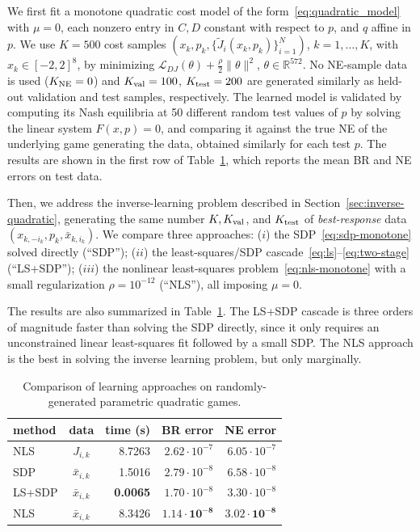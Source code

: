 \documentclass[11pt, a4paper]{article}
\renewcommand{\arraystretch}{1.3}
\newcommand{\rr}{\mathbb{R}}
\newcommand{\LL}{\mathcal{L}}
\theoremstyle{remark}
\theoremstyle{plain}
\begin{document}
We first fit a monotone quadratic cost model of the form~\eqref{eq:quadratic_model} with $\mu=0$, each nonzero entry in $C,D$ constant with respect to $p$, and $q$ affine in $p$. We use $K=500$ cost samples $(x_k,p_k,\{\tilde J_i(x_k,p_k)\}_{i=1}^N)$, $k=1,\ldots,K$, with $x_k\in[-2,2]^8$, by minimizing $\LL_{DJ}(\theta)+\frac{\rho}{2}\|\theta\|^2$, $\theta\in\rr^{572}$. 
No NE-sample data is used ($K_{\rm NE}=0$) and
$K_{\rm val}=100$, $K_{\rm test}=200$ are generated similarly as held-out validation and test samples, respectively. The learned model is validated by computing its Nash equilibria at 50 different random test values of $p$ by solving the linear system $F(x,p)=0$, and comparing it against the true NE of the underlying game generating the data, obtained similarly 
for each test $p$.
The results are shown in the first row of Table~\ref{tab:quad_game}, which reports the mean BR and NE errors on test data.

Then, we address the inverse-learning problem described in Section~\ref{sec:inverse-quadratic}, generating the same number $K,K_{\rm val}$, and $K_{\rm test}$ of {\it best-response} data $(x_{k,-i_k},p_k,\bar x_{k,i_k})$. We compare three approaches: ($i$) the SDP~\eqref{eq:sdp-monotone} solved directly (``SDP''); ($ii$) the least-squares/SDP cascade~\eqref{eq:ls}--\eqref{eq:two-stage} (``LS+SDP''); ($iii$) the nonlinear least-squares problem~\eqref{eq:nls-monotone} 
with a small regularization $\rho=10^{-12}$ (``NLS''), all imposing $\mu=0$. 

The results are also summarized in Table~\ref{tab:quad_game}. The LS+SDP cascade is three orders of magnitude faster than solving the SDP directly, since it only requires an unconstrained linear least-squares fit followed by a small SDP. The NLS approach is the best in solving the inverse learning problem, but only marginally.

\begin{table}[t]
  \centering
  \setlength{\tabcolsep}{4.5pt}
  \renewcommand{\arraystretch}{1.} %
  \begin{tabular}{l|c|rrr}
  \hline
  method & data & time (s) & BR error & NE error \\
  \hline
  NLS & $J_{i,k}$ & 8.7263 & $2.62 \cdot 10^{-7}$ & $6.05 \cdot 10^{-7}$ \\
  SDP & $\bar x_{i,k}$ & 1.5016 & $2.79 \cdot 10^{-8}$ & $6.58 \cdot 10^{-8}$ \\
  LS+SDP & $\bar x_{i,k}$ & \textbf{0.0065} & $1.70 \cdot 10^{-8}$ & $3.30 \cdot 10^{-8}$ \\
  NLS & $\bar x_{i,k}$ & 8.3426 & $\mathbf{1.14 \cdot 10^{-8}}$ & $\mathbf{3.02 \cdot 10^{-8}}$ \\
  \hline
  \end{tabular}
  \caption{Comparison of learning approaches on randomly-generated parametric quadratic games.}
  \label{tab:quad_game}
\end{table}
\end{document}
